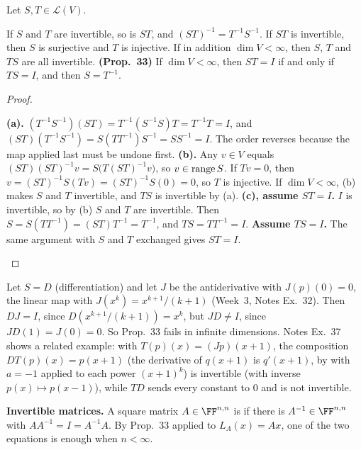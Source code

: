 \documentclass[10pt]{scrartcl}
\newcommand{\PP}{\mathcal P}\newcommand{\LL}{\mathcal L}\newcommand{\MM}{\mathcal M}
\begin{document}
\begin{proposition*}
  Let $S,T\in\LL(V)$.
  \begin{enumerate}[(a)]
    \ii If $S$ and $T$ are invertible, so is $ST$, and $(ST)^{-1}=T^{-1}S^{-1}$.
    \ii If $ST$ is invertible, then $S$ is surjective and $T$ is injective. If in addition $\dim V<\infty$, then $S$, $T$ and $TS$ are all invertible.
    \ii \textbf{(Prop.~33)} If $\dim V<\infty$, then $ST=I$ if and only if $TS=I$, and then $S=T^{-1}$.
  \end{enumerate}
\end{proposition*}
\begin{proof}
  \begin{steps}
    \ii \textbf{(a).} $(T^{-1}S^{-1})(ST)=T^{-1}(S^{-1}S)T=T^{-1}T=I$, and $(ST)(T^{-1}S^{-1})=S(TT^{-1})S^{-1}=SS^{-1}=I$. The order reverses because the map applied last must be undone first.
    \ii \textbf{(b).} Any $v\in V$ equals $(ST)(ST)^{-1}v=S\bigl(T(ST)^{-1}v\bigr)$, so $v\in\operatorname{range} S$. If $Tv=0$, then $v=(ST)^{-1}S(Tv)=(ST)^{-1}S(0)=0$, so $T$ is injective. If $\dim V<\infty$, (b) makes $S$ and $T$ invertible, and $TS$ is invertible by (a).
    \ii \textbf{(c), assume $ST=I$.} $I$ is invertible, so by (b) $S$ and $T$ are invertible. Then $S=S(TT^{-1})=(ST)T^{-1}=T^{-1}$, and $TS=TT^{-1}=I$. \textbf{Assume $TS=I$.} The same argument with $S$ and $T$ exchanged gives $ST=I$.
  \end{steps}
\end{proof}

\begin{example*}[One-sided inverses on $\PP(\RR)$ (Notes Ex.~37, 38)]
  Let $S=D$ (differentiation) and let $J$ be the antiderivative with $J(p)(0)=0$, the linear map with $J(x^k)=x^{k+1}/(k+1)$ (Week~3, Notes Ex.~32). Then $DJ=I$, since $D(x^{k+1}/(k+1))=x^k$, but $JD\ne I$, since $JD(1)=J(0)=0$. So Prop.~33 fails in infinite dimensions. Notes Ex.~37 shows a related example: with $T(p)(x)=(Jp)(x+1)$, the composition $DT(p)(x)=p(x+1)$ (the derivative of $q(x+1)$ is $q'(x+1)$, by  with $a=-1$ applied to each power $(x+1)^k$) is invertible (with inverse $p(x)\mapsto p(x-1)$), while $TD$ sends every constant to $0$ and is not invertible.
\end{example*}

\textbf{Invertible matrices.} A square matrix $A\in\FF^{n,n}$ is  if there is $A^{-1}\in\FF^{n,n}$ with $AA^{-1}=I=A^{-1}A$. By Prop.~33 applied to $L_A(x)=Ax$, one of the two equations is enough when $n<\infty$.
\end{document}
